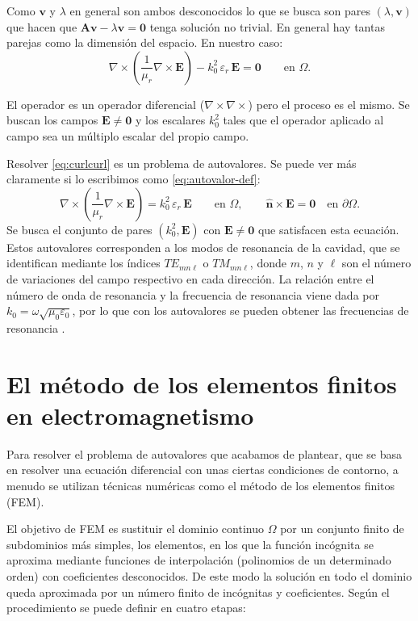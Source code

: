 \documentclass[12pt]{report} %
\begin{document}
Como $\mathbf{v}$ y $\lambda$ en general son ambos desconocidos lo que se busca son pares $(\lambda,\mathbf{v})$ que hacen que $\mathbf{A}\mathbf{v}-\lambda\mathbf{v}=\mathbf{0}$ tenga soluci\'on no trivial. En general hay tantas parejas como la
dimensi\'on del espacio. En nuestro caso:
\begin{equation}
	\nabla \times \left( \frac{1}{\mu_r} \nabla \times \mathbf{E} \right)
	- k_0^2\, \varepsilon_r\, \mathbf{E} = \mathbf{0}
	\qquad \text{en } \Omega.
\end{equation}

El operador es un operador diferencial ($\nabla\times\nabla\times$) pero el proceso es el mismo. Se buscan los campos $\mathbf{E}\neq\mathbf{0}$ y los
escalares $k_0^2$ tales que el operador aplicado al campo sea un m\'ultiplo
escalar del propio campo.

Resolver \eqref{eq:curlcurl} es un problema de autovalores. Se puede ver más claramente si lo escribimos como \eqref{eq:autovalor-def}:
\begin{equation}\label{eq:autovalor-continuo}
	\nabla \times \left( \frac{1}{\mu_r} \nabla \times \mathbf{E} \right)
	= k_0^2\, \varepsilon_r\, \mathbf{E}
	\qquad \text{en } \Omega,
	\qquad \hat{\mathbf{n}} \times \mathbf{E} = \mathbf{0}
	\quad \text{en } \partial\Omega .
\end{equation}
Se busca el conjunto de pares $(k_0^2, \mathbf{E})$ con
$\mathbf{E}\neq\mathbf{0}$ que satisfacen esta ecuación.
Estos autovalores corresponden a los modos de resonancia de la cavidad, que se
identifican mediante los \'indices $TE_{mn\ell}$ o
$TM_{mn\ell}$, donde $m$, $n$ y $\ell$ son el n\'umero de variaciones del
campo respectivo en cada direcci\'on. La relaci\'on entre el n\'umero de
onda de resonancia y la frecuencia de resonancia viene dada por
$k_0 = \omega\sqrt{\mu_0\varepsilon_0}$, por lo que con los autovalores se
pueden obtener las frecuencias de resonancia \cite{pozar2012}.

\section{El método de los elementos finitos en electromagnetismo}\label{sec:mef}
Para resolver el problema de autovalores que acabamos de plantear, que se basa en resolver una ecuación diferencial con unas ciertas condiciones de contorno, a menudo se utilizan técnicas numéricas como el método de los elementos finitos (FEM).

El objetivo de FEM es sustituir el dominio continuo $\Omega$ por un conjunto finito de subdominios más simples, los elementos, en los que la función incógnita se aproxima mediante funciones de interpolación (polinomios de un determinado orden) con coeficientes desconocidos. De este modo la solución en todo el dominio queda aproximada por un número finito de incógnitas y coeficientes. Según \cite{jin2015} el procedimiento se puede definir en cuatro etapas:
\end{document}
